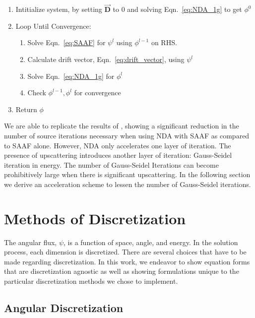 \begin{enumerate}
    \item Intitialize system, by setting $\vec{\textbf{D}}$ to 0 and solving Eqn.~\eqref{eq:NDA_1g} to get $\phi^0$ 
    \item Loop Until Convergence:
        \begin{enumerate}
            \item Solve Eqn.~\eqref{eq:SAAF} for $\psi^l$ using $\phi^{l-1}$ on RHS.
            \item Calculate drift vector, Eqn.~\eqref{eq:drift_vector}, using $\psi^l$
            \item Solve Eqn.~\eqref{eq:NDA_1g} for $\phi^l$
            \item Check $\phi^{l-1}, \phi^l$ for convergence
        \end{enumerate}
    \item Return $\phi$
\end{enumerate}

We are able to replicate the results of \cite{Wang2013}, showing a significant reduction in the number of source iterations necessary when using NDA with SAAF as compared to SAAF alone. However, NDA only accelerates one layer of iteration. The presence of upscattering introduces another layer of iteration: Gauss-Seidel iteration in energy. The number of Gauss-Seidel Iterations can become prohibitively large when there is significant upscattering. In the following section we derive an acceleration scheme to lessen the number of Gauss-Seidel iterations.

\section{Methods of Discretization}
The angular flux, $\psi$, is a function of space, angle, and energy. In the solution process, each dimension is discretized. There are several choices that have to be made regarding discretization. In this work, we endeavor to show equation forms that are discretization agnostic as well as showing formulations unique to the particular discretization methods we chose to implement. 

\subsection{Angular Discretization}
 
